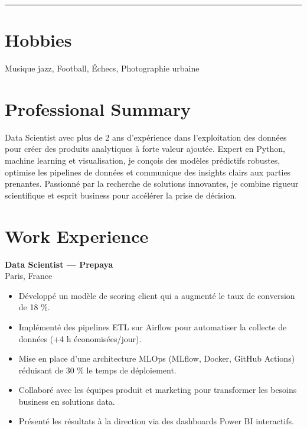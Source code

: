 \documentclass[10pt,letterpaper]{article}
\newcommand{\cvHr}{\vspace{0.5\baselineskip}\hrule height 1pt\color{primary}\vspace{0.7\baselineskip}}
\begin{document}
\begin{paracol}{2}
\begin{leftcolumn}
\cvHr

\section*{Hobbies}
Musique jazz, Football, Échecs, Photographie urbaine

\end{leftcolumn}

\begin{rightcolumn}

\section*{Professional Summary}
Data Scientist avec plus de 2 ans d’expérience dans l’exploitation des données pour créer des produits analytiques à forte valeur ajoutée. Expert en Python, machine learning et visualisation, je conçois des modèles prédictifs robustes, optimise les pipelines de données et communique des insights clairs aux parties prenantes. Passionné par la recherche de solutions innovantes, je combine rigueur scientifique et esprit business pour accélérer la prise de décision.

\vspace{1in}

\section*{Work Experience}

\begin{tcolorbox}
  \begin{minipage}[t]{0.48\linewidth}
    \textbf{Data Scientist — Prepaya}\\
    Paris, France
    \begin{itemize}
      \item Développé un modèle de scoring client qui a augmenté le taux de conversion de 18 \%.
      \item Implémenté des pipelines ETL sur Airflow pour automatiser la collecte de données (+4 h économisées/jour).
      \item Mise en place d’une architecture MLOps (MLflow, Docker, GitHub Actions) réduisant de 30 \% le temps de déploiement.
      \item Collaboré avec les équipes produit et marketing pour transformer les besoins business en solutions data.
      \item Présenté les résultats à la direction via des dashboards Power BI interactifs.
    \end{itemize}
  \end{minipage}\hfill
  \begin{minipage}[t]{0.48\linewidth}
    \raggedleft
  \end{minipage}
\end{tcolorbox}


\end{rightcolumn}
\end{paracol}
\end{document}
